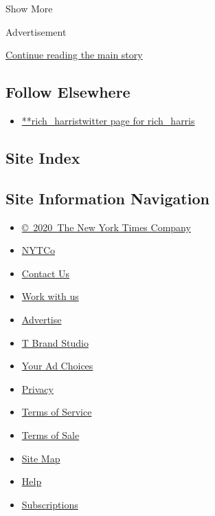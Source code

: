 Show More

Advertisement

\protect\hyperlink{after-mid2}{Continue reading the main story}

\hypertarget{follow-elsewhere}{%
\subsection{Follow Elsewhere}\label{follow-elsewhere}}

\begin{itemize}
\tightlist
\item
  \href{https://twitter.com/rich_harris}{**rich\_harristwitter page for
  rich\_harris}
\end{itemize}

\hypertarget{site-index}{%
\subsection{Site Index}\label{site-index}}

\hypertarget{site-information-navigation}{%
\subsection{Site Information
Navigation}\label{site-information-navigation}}

\begin{itemize}
\tightlist
\item
  \href{https://help.nytimes3xbfgragh.onion/hc/en-us/articles/115014792127-Copyright-notice}{©~2020~The
  New York Times Company}
\end{itemize}

\begin{itemize}
\tightlist
\item
  \href{https://www.nytco.com/}{NYTCo}
\item
  \href{https://help.nytimes3xbfgragh.onion/hc/en-us/articles/115015385887-Contact-Us}{Contact
  Us}
\item
  \href{https://www.nytco.com/careers/}{Work with us}
\item
  \href{https://nytmediakit.com/}{Advertise}
\item
  \href{http://www.tbrandstudio.com/}{T Brand Studio}
\item
  \href{https://www.nytimes3xbfgragh.onion/privacy/cookie-policy\#how-do-i-manage-trackers}{Your
  Ad Choices}
\item
  \href{https://www.nytimes3xbfgragh.onion/privacy}{Privacy}
\item
  \href{https://help.nytimes3xbfgragh.onion/hc/en-us/articles/115014893428-Terms-of-service}{Terms
  of Service}
\item
  \href{https://help.nytimes3xbfgragh.onion/hc/en-us/articles/115014893968-Terms-of-sale}{Terms
  of Sale}
\item
  \href{https://spiderbites.nytimes3xbfgragh.onion}{Site Map}
\item
  \href{https://help.nytimes3xbfgragh.onion/hc/en-us}{Help}
\item
  \href{https://www.nytimes3xbfgragh.onion/subscription?campaignId=37WXW}{Subscriptions}
\end{itemize}
